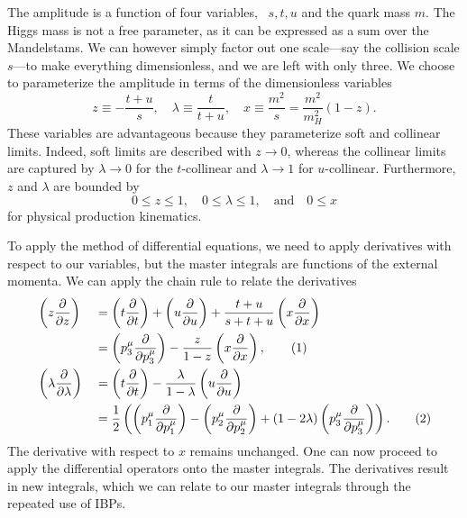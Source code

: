 The amplitude is a function of four variables, \eg\ $s, t, u$ and the quark mass $m$. The Higgs mass is not a free parameter, as it can be expressed as a sum over the Mandelstams. We can however simply factor out one scale---say the collision scale $s$---to make everything dimensionless, and we are left with only three. We choose to parameterize the amplitude in terms of the dimensionless variables
\begin{equation}
z \equiv - \frac{t + u}{s}, \quad \lambda \equiv \frac{t}{t + u}, \quad x \equiv \frac{m^2}{s} = \frac{m^2}{m_H^2} (1 - z).
\label{eq:5:physical_parameter_space}
\end{equation}
These variables are advantageous because they parameterize soft and collinear limits. Indeed, soft limits are described with $z \rightarrow 0$, whereas the collinear limits are captured by $\lambda \rightarrow 0$ for the $t$-collinear and $\lambda \rightarrow 1$ for $u$-collinear. Furthermore, $z$ and $\lambda$ are bounded by
\begin{equation}
0 \le z \le 1, \quad 0 \le \lambda \le 1, \quad \text{and} \quad 0 \le x
\end{equation}
for physical production kinematics.

To apply the method of differential equations, we need to apply derivatives with respect to our variables, but the master integrals are functions of the external momenta. We can apply the chain rule to relate the derivatives
\begin{alignat*}{2}
\refstepcounter{equation}
&\left(z \frac{\partial }{\partial z} \right) &&= \left(t \frac{\partial }{ \partial t} \right) + \left( u \frac{\partial}{ \partial u} \right) + \frac{t + u}{s + t + u} \left(x \frac{\partial}{ \partial x} \right) \\
& &&= \left(p_3^\mu \frac{\partial}{\partial p_3^\mu} \right) - \frac{z}{1 - z} \left(x \frac{\partial }{\partial x} \right), \tag{\theequation} \\
\refstepcounter{equation}
& \left(\lambda \frac{\partial}{\partial \lambda}\right) && = \left(t \frac{\partial}{\partial t} \right) - \frac{\lambda}{1 - \lambda} \left(u \frac{\partial}{\partial u} \right) \\
& &&= \frac{1}{2} \left( \left(p_1^\mu \frac{\partial}{\partial p_1^\mu} \right) - \left(p_2^\mu \frac{\partial}{\partial p_2^\mu} \right) + (1 - 2 \lambda) \left(p_3^\mu \frac{\partial}{\partial p_3^\mu} \right)\right).  \tag{\theequation}
\end{alignat*}
The derivative with respect to $x$ remains unchanged. One can now proceed to apply the differential operators onto the master integrals. The derivatives result in new integrals, which we can relate to our master integrals through the repeated use of \acs{IBP}s.

